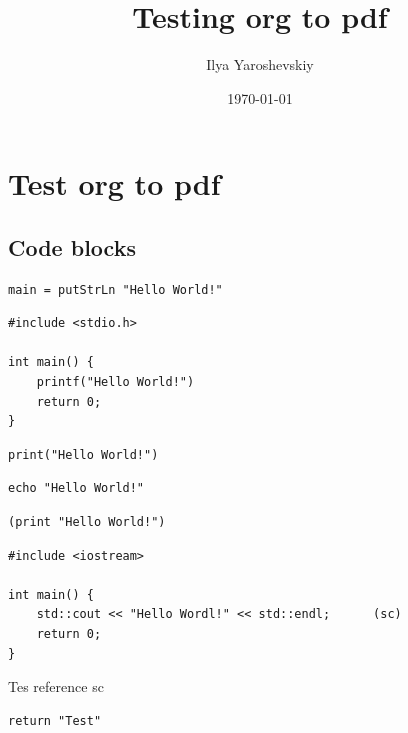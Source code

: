 \documentclass{article}
\author{Ilya Yaroshevskiy}
\date{\today}
\title{Testing org to pdf}
\begin{document}
\maketitle
\tableofcontents


\section{Test org to pdf}
\label{sec:orgac345b3}
\subsection{Code blocks}
\label{sec:org89144ae}

\begin{verbatim}
main = putStrLn "Hello World!"
\end{verbatim}

\begin{verbatim}
#include <stdio.h>

int main() {
    printf("Hello World!")
    return 0;
}
\end{verbatim}

\begin{verbatim}
print("Hello World!")
\end{verbatim}

\begin{verbatim}
echo "Hello World!"
\end{verbatim}

\begin{verbatim}
(print "Hello World!")
\end{verbatim}


\begin{listing}[htbp]
\begin{verbatim}
#include <iostream>

int main() {
    std::cout << "Hello Wordl!" << std::endl;      (sc)
    return 0;
}
\end{verbatim}
\caption{C++ Hello world}
\end{listing}

Tes reference sc

\begin{verbatim}
return "Test"
\end{verbatim}
\end{document}
